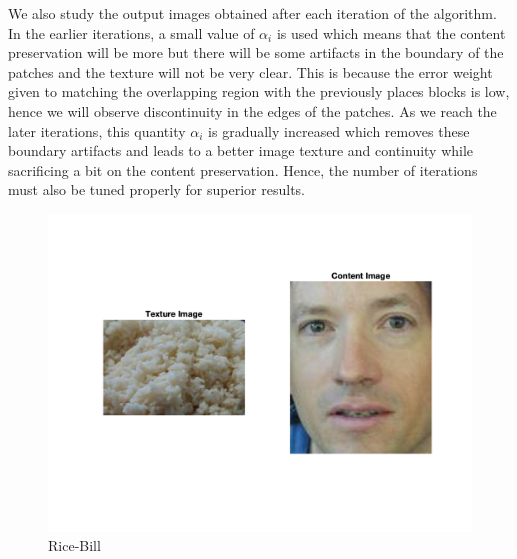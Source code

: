 \documentclass[10pt,twocolumn,letterpaper]{article}
\begin{document}
We also study the output images obtained after each iteration of the algorithm. In the earlier iterations, a small value of $\alpha_{i}$ is used which means that the content preservation will be more but there will be some artifacts in the boundary of the patches and the texture will not be very clear. This is because the error weight given to matching the overlapping region with the previously places blocks is low, hence we will observe discontinuity in the edges of the patches. As we reach the later iterations, this quantity $\alpha_{i}$ is gradually increased which removes these boundary artifacts and leads to a better image texture and continuity while sacrificing a bit on the content preservation. Hence, the number of iterations must also be tuned properly for superior results.
\begin{figure}[h]
    \begin{center}
    \includegraphics[trim={2cm 4cm 2cm 2cm}, clip, scale=0.5]{../results/bsize/inp_rice_bill.png}
    \end{center}
    \vspace{-0.2em}
    \caption{Rice-Bill}
    \label{fig:rice_bill}
\end{figure}
\end{document}
